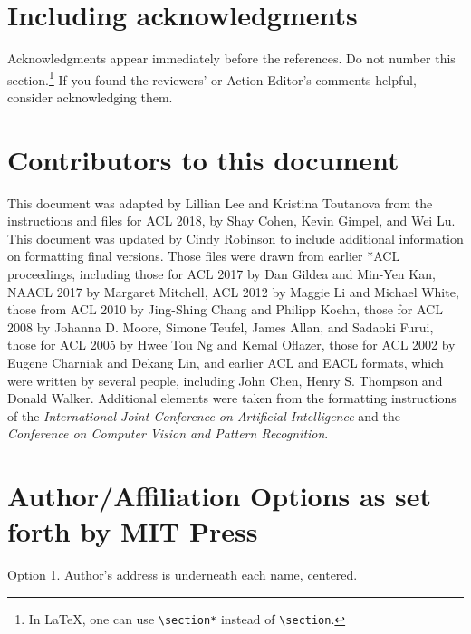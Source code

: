\documentclass[11pt,a4paper]{article}
\begin{document}
\iftaclpubformat

\section{Including acknowledgments}
Acknowledgments appear immediately before the references.  Do not number this
section.\footnote{In \LaTeX, one can use {\tt {\textbackslash}section*} instead
of {\tt {\textbackslash}section}.} If you found the reviewers' or Action
Editor's comments helpful, consider acknowledging them.
\else
\fi

\section{Contributors to this document}
\label{sec:contributors}

This document was adapted by Lillian Lee and Kristina Toutanova
from the instructions and files for ACL 2018, by Shay Cohen, Kevin Gimpel, and
Wei Lu.
This document was updated by Cindy Robinson to
include additional information on formatting final versions.
Those files were drawn from earlier *ACL proceedings, including those
for ACL 2017 by Dan Gildea and Min-Yen Kan, NAACL 2017 by Margaret Mitchell,
ACL 2012 by Maggie Li and Michael White, those from ACL 2010 by Jing-Shing
Chang and Philipp Koehn, those for ACL 2008 by Johanna D. Moore, Simone
Teufel, James Allan, and Sadaoki Furui, those for ACL 2005 by Hwee Tou Ng and
Kemal Oflazer, those for ACL 2002 by Eugene Charniak and Dekang Lin, and
earlier ACL and EACL formats,  which were written by several people,
including John Chen, Henry S. Thompson and Donald Walker. Additional elements
were taken from the formatting instructions of the {\em International Joint
Conference on Artificial   Intelligence} and the \emph{Conference on Computer
Vision and Pattern Recognition}.




\iftaclpubformat

\onecolumn

\appendix
\section{Author/Affiliation Options as set forth by MIT Press}
\label{sec:authorformatting}

Option 1. Author’s address is underneath each name, centered.
\end{document}
